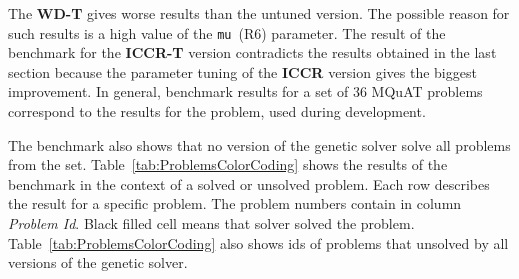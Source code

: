 The \textbf{WD-T} gives worse results than the untuned version. The possible reason for such results is a high value of the \texttt{mu}~(R6) parameter. The result of the benchmark for the \textbf{ICCR-T} version contradicts the results obtained in the last section because the parameter tuning of the \textbf{ICCR} version gives the biggest improvement. In general, benchmark results for a set of 36 MQuAT problems correspond to the results for the problem, used during development.

The benchmark also shows that no version of the genetic solver solve all problems from the set. Table~\ref{tab:ProblemsColorCoding} shows the results of the benchmark in the context of a solved or unsolved problem. Each row describes the result for a specific problem. The problem numbers contain in column \textit{Problem Id}. Black filled cell means that solver solved the problem. Table~\ref{tab:ProblemsColorCoding} also shows ids of problems that unsolved by all versions of the genetic solver.

